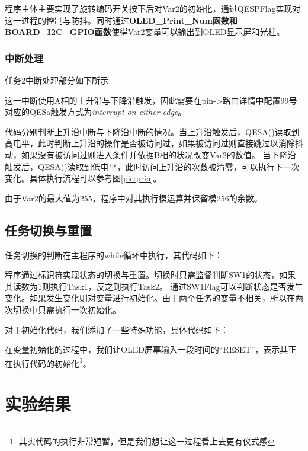 \documentclass[12pt]{article}
\begin{document}
程序主体主要实现了旋转编码开关按下后对Var2的初始化，通过QESPFlag实现对这一进程的控制与防抖。同时通过\textbf{OLED\_Print\_Num函数和BOARD\_I2C\_GPIO函数}使得Var2变量可以输出到OLED显示屏和光柱。

\subsubsection{中断处理}

任务2中断处理部分如下所示


这一中断使用A相的上升沿与下降沿触发，因此需要在pin->路由详情中配置99号对应的QESa触发方式为\emph{interrupt on either edge}。

代码分别判断上升沿中断与下降沿中断的情况。当上升沿触发后，QESA()读取到高电平，此时判断上升沿的操作是否被访问过，如果被访问过则直接跳过以消除抖动，如果没有被访问过则进入条件并依据B相的状况改变Var2的数值。
当下降沿触发后，QESA()读取到低电平，此时访问上升沿的次数被清零，可以执行下一次变化。具体执行流程可以参考图\ref{pic:prin}。

由于Var2的最大值为255，程序中对其执行模运算并保留模256的余数。


\subsection{任务切换与重置}
任务切换的判断在主程序的while循环中执行，其代码如下：


程序通过标识符实现状态的切换与重置。切换时只需监督判断SW1的状态，如果其读数为1则执行Task1，反之则执行Task2。
通过SW1Flag可以判断状态是否发生变化。如果发生变化则对变量进行初始化。由于两个任务的变量不相关，所以在两次切换中只需执行一次初始化。

对于初始化代码，我们添加了一些特殊功能，具体代码如下：


在变量初始化的过程中，我们让OLED屏幕输入一段时间的“RESET”，表示其正在执行代码的初始化\footnote{其实代码的执行非常短暂，但是我们想让这一过程看上去更有仪式感}。

\section{实验结果}
\end{document}
